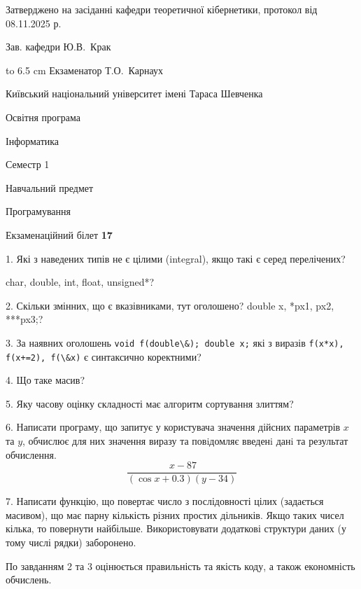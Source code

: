 \documentclass[12pt, ukrainian]{article}
\def\code#1{\Verb!#1!}
\begin{document}
{\smallskip\smallskip \begin {scriptsize} Затверджено на засіданні кафедри теоретичної кібернетики, протокол   від   08.11.2025 р.\par\smallskip\smallskip\smallskip\smallskip
{\parbox {6.5 cm} {Зав. кафедри \dotfill Ю.В.~Крак}}\hspace {0.7cm} {\hbox to 6.5 cm { Екзаменатор \dotfill Т.О.~Карнаух}} \end{scriptsize}}
\newpage
{{\begin {scriptsize}\par
{ \center  Київський національний університет імені Тараса Шевченка \par}
{\parbox {5 cm}{Освітня програма \hfill}{\parbox {7 cm}{Інформатика\hfill}}\parbox {6 cm}{\hfill Семестр 1}}\par
{\parbox {5 cm} {Навчальний предмет \hfill}\parbox {7 cm}{Програмування \hfill}\parbox {6cm}{\hfill}\par}\vspace{-15pt} \end{scriptsize}}{\center Екзаменаційний білет \No \textbf { 17 }\par}}
{%
1. Які з наведених типів не є цілими (integral), якщо такі є серед перелічених?

char, double, int, float, unsigned*?
\par
\vspace{2mm}
2. Скільки змінних, що є вказівниками, тут оголошено?
double x, *px1, px2, ***px3;?
\par
\vspace{2mm}
3. За наявних оголошень \code{void f(double\&); double x;} які з виразів \code{f(x*x), f(x+=2), f(\&x)} є синтаксично коректними?
\par
\vspace{2mm}
4. Що таке масив?
\par
\vspace{2mm}
5. Яку часову оцінку складності має алгоритм сортування злиттям?
\par
\vspace{2mm}
6. Написати програму, що запитує у користувача значення дійсних параметрів $x$ та $y$, обчислює для них значення виразу та повiдомляє введенi данi та результат обчислення.
$$\frac{\ x - 87}{(\cos x + 0.3) (y - 34)}$$ 

\par
7. Написати функцію, що повертає число з послідовності цілих (задається масивом), що має парну кількість різних простих дільників. Якщо таких чисел кілька, то повернути найбільше. Використовувати додаткові структури даних (у тому числі рядки) заборонено.

По завданням 2 та 3 оцінюється правильність та якість коду, а також економність обчислень.

}
\end{document}
